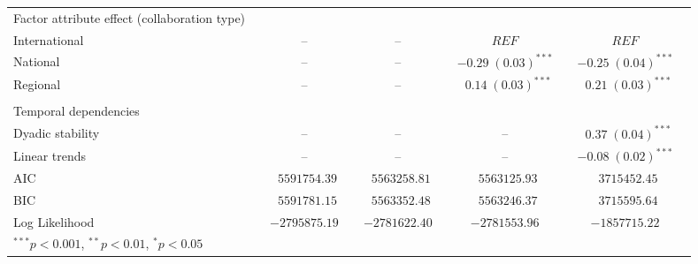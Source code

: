 \begin{table}
\begin{center}
\begin{tabular}{@{}lcclclclcl@{}}
Factor attribute effect (collaboration type) & & & & & & & & \\
\hspace{10pt}International & & -- & & -- & & $REF$ & & $REF$ \\
\hspace{10pt}National &  &         --            &  &         --            &  & $-0.29 \; (0.03)^{***}$ &  & $-0.25 \; (0.04)^{***}$ \\
\hspace{10pt}Regional &  &         --            &  &         --            &  & $\hspace{6pt}0.14 \; (0.03)^{***}$  &  & $\hspace{6pt}0.21 \; (0.03)^{***}$  \\\\
Temporal dependencies & & & & & & & & \\
\hspace{10pt}Dyadic stability                 &  &         --            &  &          --           &  &    --                   &  & $\hspace{6pt}0.37 \; (0.04)^{***}$  \\
\hspace{10pt}Linear trends               &  &          --           &  &         --            &  &       --                &  & $-0.08 \; (0.02)^{***}$ \\
\midrule
AIC        &  & $\hspace{6pt}5591754.39$  &  & $\hspace{6pt}5563258.81$ &  & $\hspace{6pt}5563125.93$            &  & $\hspace{6pt}3715452.45$            \\
BIC              &  & $\hspace{6pt}5591781.15$            &  & $\hspace{6pt}5563352.48$            &  & $\hspace{6pt}5563246.37$            &  & $\hspace{6pt}3715595.64$            \\
Log Likelihood                 &  & $-2795875.19$           &  & $-2781622.40$           &  & $-2781553.96$           &  & $-1857715.22$           \\
\bottomrule
\multicolumn{5}{l}{\scriptsize{$^{***}p<0.001$, $^{**}p<0.01$, $^*p<0.05$}}
\end{tabular}
\end{center}
\end{table}

